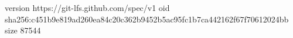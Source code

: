 version https://git-lfs.github.com/spec/v1
oid sha256:c451b9e819ad260ea84c20c362b9452b5ac95fc1b7ca442162f67f70612024bb
size 87544

